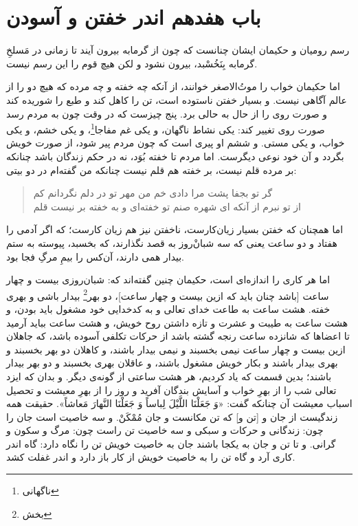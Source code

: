 \section*{باب هفدهم
اندر خفتن و آسودن}

رسم روميان و حكيمان ايشان چنانست كه چون از گرمابه بيرون آيند تا زمانى در مَسلخِ گرمابه بِنَخُسْبد، بيرون نشود و لكن هيچ قوم را اين رسم نيست.

اما حكيمان خواب را موت‌ُالاصغر خوانند، از آنكه چه خفته و چه مرده كه هيچ دو را از عالم آگاهى نيست. و بسيار خفتن ناستوده است، تن را كاهل كند و طبع را شوريده كند و صورت روى را از حال به حالى برد. پنج چيزست كه در وقت چون به مردم رسد صورت روى تغيير كند: يكى نشاط ناگهان، و يكى غم مفاجا\footnote{ناگهانی}، و يكى خشم، و يكى خواب، و يكى مستى. و ششم او پيرى است كه چون مردم پير شود، از صورت خويش بگردد و آن خود نوعى ديگرست. اما مردم تا خفته بُوَد، نه در حكم زندگان  باشد چنانكه بر مرده قلم نيست، بر خفته هم قلم نيست چنانكه من گفته‌ام در دو بيتى: 


\begin{quote}
\centering
گر تو بجفا پشت مرا دادى خم \quad \quad 
من مهر تو در دلم نگردانم كم \\
از تو نبرم از آنكه اى شهره صنم \quad \quad 
تو خفته‌اى و به خفته بر نيست قلم
\end{quote}

اما همچنان كه خفتن بسيار زيان‌كارست، ناخفتن نيز هم زيان كارست؛ كه اگر آدمى را هفتاد و دو ساعت يعنى كه سه شبان‌ْروز به قصد نگذارند، كه بخسبد، پيوسته به ستم بيدار همى دارند، آن‌كس را بيمِ مرگِ فجا بود.

اما هر كارى را اندازه‌اى است، حكيمان چنين گفته‌اند كه: شبان‌روزى بيست و چهار ساعت [باشد چنان بايد كه ازين بيست و چهار ساعت]، دو بهر\footnote{بخش} بيدار باشى و بهرى خفته. هشت ساعت به طاعت خداى تعالى و به كدخدايى خود مشغول بايد بودن، و هشت ساعت به طيبت و عشرت و تازه داشتن روح خويش، و هشت ساعت ببايد آرميد تا اعضاها كه شانزده ساعت رنجه گشته باشد از حركات تكلفى آسوده باشد، كه جاهلان ازين بيست و چهار ساعت نيمى بخسبند و نيمى بيدار باشند، و كاهلان دو بهر بخسبند و بهرى بيدار باشند و بكار خويش مشغول باشند، و عاقلان بهرى بخسبند و دو بهر بيدار باشند؛ بدين قسمت كه ياد كرديم، هر هشت ساعتى از گونه‌ی ديگر. و بدان كه ايزد تعالى شب را از بهرِ خواب و آسايش بندگان آفريد و روز را از بهرِ معيشت و تحصيل اسباب معيشت آن چنانكه گفت: «وَ جَعَلْنَا اللَّيْلَ لِباساً وَ جَعَلْنَا النَّهارَ مَعاشاً». حقيقت همه زندگيست از جان و [تن و] كه تن مكانست و جان مُمْكَنْ. و سه خاصيت است جان را چون: زندگانى و حركات و سبكى و سه خاصيت تن راست چون: مرگ و سكون و گرانى. و تا تن و جان به يكجا باشند جان به خاصيت خويش تن را نگاه دارد: گاه اندر كارى آرد و گاه تن را به خاصيت خويش از كار باز دارد و اندر غفلت كشد.

